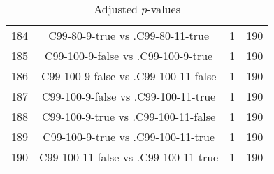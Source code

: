 \documentclass[a4paper,10pt]{article}
\begin{document}
\begin{landscape}
\begin{table}[!htp]
\begin{tabular}{cccc}
184&C99-80-9-true vs .C99-80-11-true&1&190\\
185&C99-100-9-false vs .C99-100-9-true&1&190\\
186&C99-100-9-false vs .C99-100-11-false&1&190\\
187&C99-100-9-false vs .C99-100-11-true&1&190\\
188&C99-100-9-true vs .C99-100-11-false&1&190\\
189&C99-100-9-true vs .C99-100-11-true&1&190\\
190&C99-100-11-false vs .C99-100-11-true&1&190\\
\hline
\end{tabular}
\caption{Adjusted $p$-values}
\end{table}

\end{landscape}
\end{document}
